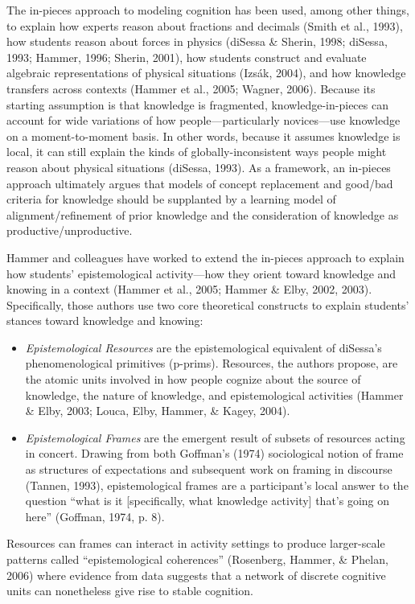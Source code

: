 The in-pieces approach to modeling cognition has been used, among other
things, to explain how experts reason about fractions and decimals
(Smith et al., 1993), how students reason about forces in physics
(diSessa \& Sherin, 1998; diSessa, 1993; Hammer, 1996; Sherin, 2001),
how students construct and evaluate algebraic representations of
physical situations (Izsák, 2004), and how knowledge transfers across
contexts (Hammer et al., 2005; Wagner, 2006). Because its starting
assumption is that knowledge is fragmented, knowledge-in-pieces can
account for wide variations of how people---particularly novices---use
knowledge on a moment-to-moment basis. In other words, because it
assumes knowledge is local, it can still explain the kinds of
globally-inconsistent ways people might reason about physical situations
(diSessa, 1993). As a framework, an in-pieces approach ultimately argues
that models of concept replacement and good/bad criteria for knowledge
should be supplanted by a learning model of alignment/refinement of
prior knowledge and the consideration of knowledge as
productive/unproductive.

Hammer and colleagues have worked to extend the in-pieces approach to
explain how students' epistemological activity---how they orient toward
knowledge and knowing in a context (Hammer et al., 2005; Hammer \& Elby,
2002, 2003). Specifically, those authors use two core theoretical
constructs to explain students' stances toward knowledge and knowing:

\begin{itemize}
\item
  \emph{Epistemological Resources} are the epistemological equivalent of
  diSessa's phenomenological primitives (p-prims). Resources, the
  authors propose, are the atomic units involved in how people cognize
  about the source of knowledge, the nature of knowledge, and
  epistemological activities (Hammer \& Elby, 2003; Louca, Elby, Hammer,
  \& Kagey, 2004).
\item
  \emph{Epistemological Frames} are the emergent result of subsets of
  resources acting in concert. Drawing from both Goffman's (1974)
  sociological notion of frame as structures of expectations and
  subsequent work on framing in discourse (Tannen, 1993),
  epistemological frames are a participant's local answer to the
  question ``what is it {[}specifically, what knowledge activity{]}
  that's going on here'' (Goffman, 1974, p. 8).
\end{itemize}

Resources can frames can interact in activity settings to produce
larger-scale patterns called ``epistemological coherences'' (Rosenberg,
Hammer, \& Phelan, 2006) where evidence from data suggests that a
network of discrete cognitive units can nonetheless give rise to stable
cognition.



